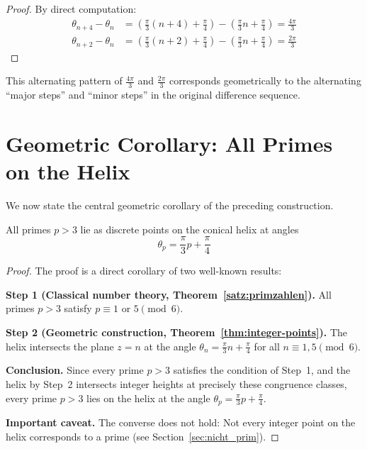 \begin{proof}
By direct computation:
\begin{align}
\theta_{n+4} - \theta_n &= \left(\frac{\pi}{3}(n+4) + \frac{\pi}{4}\right) - \left(\frac{\pi}{3}n + \frac{\pi}{4}\right) = \frac{4\pi}{3}\\
\theta_{n+2} - \theta_n &= \left(\frac{\pi}{3}(n+2) + \frac{\pi}{4}\right) - \left(\frac{\pi}{3}n + \frac{\pi}{4}\right) = \frac{2\pi}{3}
\end{align}
\end{proof}

\begin{remark}
This alternating pattern of $\frac{4\pi}{3}$ and $\frac{2\pi}{3}$ corresponds geometrically to the alternating ``major steps'' and ``minor steps'' in the original difference sequence.
\end{remark}

\section{Geometric Corollary: All Primes on the Helix}

We now state the central geometric corollary of the preceding construction.

\begin{theorem}\label{thm:main-result}
All primes $p > 3$ lie as discrete points on the conical helix at angles
\begin{equation}\label{eq:prime-angles}
\boxed{\theta_p = \frac{\pi}{3}p + \frac{\pi}{4}}
\end{equation}
\end{theorem}

\begin{proof}
The proof is a direct corollary of two well-known results:

\textbf{Step 1 (Classical number theory, Theorem~\ref{satz:primzahlen}).} 
All primes $p > 3$ satisfy $p \equiv 1$ or $5 \pmod{6}$.

\textbf{Step 2 (Geometric construction, Theorem~\ref{thm:integer-points}).}
The helix intersects the plane $z = n$ at the angle $\theta_n = \frac{\pi}{3}n + \frac{\pi}{4}$
for all $n \equiv 1, 5 \pmod{6}$.

\textbf{Conclusion.} Since every prime $p > 3$ satisfies the condition of Step~1,
and the helix by Step~2 intersects integer heights at precisely these congruence classes,
every prime $p > 3$ lies on the helix at the angle $\theta_p = \frac{\pi}{3}p + \frac{\pi}{4}$.

\textbf{Important caveat.} The converse does not hold: Not every
integer point on the helix corresponds to a prime (see
Section~\ref{sec:nicht_prim}).
\end{proof}

